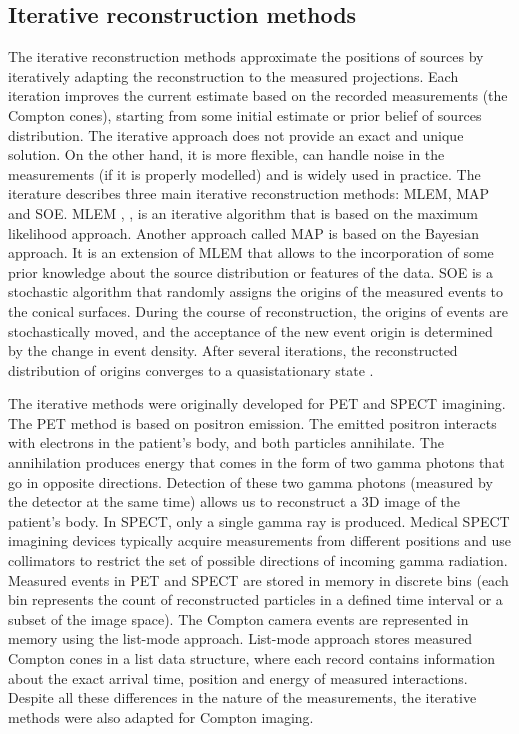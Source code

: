 \subsection{Iterative reconstruction methods}
The iterative reconstruction methods approximate the positions of sources by iteratively adapting the reconstruction to the measured projections.
Each iteration improves the current estimate based on the recorded measurements (the Compton cones), starting from some initial estimate or prior belief of sources distribution. 
The iterative approach does not provide an exact and unique solution. On the other hand, it is more flexible, can handle noise in the measurements (if it is properly modelled) and is widely used in practice.
The iterature \cite{frandes2016} describes three main iterative reconstruction methods: \acf{MLEM}, \acf{MAP} and \acf{SOE}.
\ac{MLEM} \cite{MLEM_Shepp_1982}, \cite{MLEM_Lange_Carlson_1984}, \cite{MLEM_Wilderman_2000} is an iterative algorithm that is based on the maximum likelihood approach.
Another approach called \ac{MAP} \cite{MLEM_Lange_Carlson_1984} is based on the Bayesian approach.
It is an extension of \ac{MLEM} that allows to the incorporation of some prior knowledge about the source distribution or features of the data.
\ac{SOE} is a stochastic algorithm that randomly assigns the origins of the measured events to the conical surfaces.
During the course of reconstruction, the origins of events are stochastically moved, and the acceptance of the new event origin is determined by the change in event density.
After several iterations, the reconstructed distribution of origins converges to a quasistationary state \cite{SOE_Andreyev_2009}.

The iterative methods were originally developed for \ac{PET} and \ac{SPECT} imagining.
The \ac{PET}  method is based on positron emission. 
The emitted positron interacts with electrons in the patient's body, and both particles annihilate. 
The annihilation produces energy that comes in the form of two gamma photons that go in opposite directions.
Detection of these two gamma photons (measured by the detector at the same time) allows us to reconstruct a 3D image of the patient's body.
In \ac{SPECT}, only a single gamma ray is produced. 
Medical \ac{SPECT} imagining devices typically acquire measurements from different positions and use collimators to restrict the set of possible directions of incoming gamma radiation.
Measured events in \ac{PET} and \ac{SPECT} are stored in memory in discrete bins (each bin represents the count of reconstructed particles in a defined time interval or a subset of the image space).
The Compton camera events are represented in memory using the list-mode approach.
List-mode approach stores measured Compton cones in a list data structure, where each record contains information about the exact arrival time, position and energy of measured interactions.
Despite all these differences in the nature of the measurements, the iterative methods were also adapted for Compton imaging.

